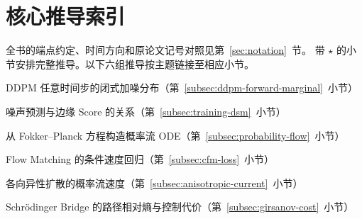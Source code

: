 \chapter{核心推导索引}

全书的端点约定、时间方向和原论文记号对照见第~\ref{sec:notation}~节。
带 \(\star\) 的小节安排完整推导。以下六组推导按主题链接至相应小节。

\begin{description}[leftmargin=2em,labelsep=0.7em,itemsep=0.7em]
  \item[A] DDPM 任意时间步的闭式加噪分布（第~\ref{subsec:ddpm-forward-marginal}~小节）
  \item[B] 噪声预测与边缘 Score 的关系（第~\ref{subsec:training-dsm}~小节）
  \item[C] 从 Fokker--Planck 方程构造概率流 ODE（第~\ref{subsec:probability-flow}~小节）
  \item[D] Flow Matching 的条件速度回归（第~\ref{subsec:cfm-loss}~小节）
  \item[E] 各向异性扩散的概率流速度（第~\ref{subsec:anisotropic-current}~小节）
  \item[F] Schrödinger Bridge 的路径相对熵与控制代价（第~\ref{subsec:girsanov-cost}~小节）
\end{description}
